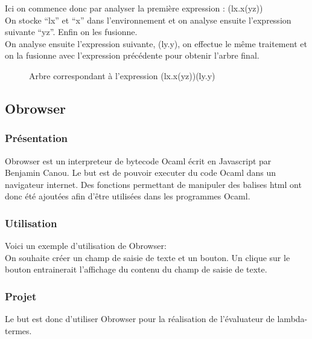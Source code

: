 \documentclass[a4paper,11pt,titlepage]{article}
\begin{document}
\newpage
Ici on commence donc par analyser la première expression : (lx.x(yz))\\
On stocke ``lx'' et ``x'' dans l'environnement et on analyse ensuite l'expression suivante ``yz''. Enfin on les fusionne.\\

On analyse ensuite l'expression suivante, (ly.y), on effectue le même traitement et on la fusionne avec l'expression précédente pour obtenir l'arbre final.
\begin{figure}[H]
\centering
  {
	 {{
		 {
			  {
			   {}
			   {
			      {{}
			       {}}
			   }
			  }
		 }
	 }
	{
		{}


	}}
  }
\caption{Arbre correspondant à l'expression (lx.x(yz))(ly.y)}
 \label{tree3}
\end{figure}

\subsection{Obrowser}

\subsubsection{Présentation}
Obrowser est un interpreteur de bytecode Ocaml écrit en Javascript par Benjamin Canou. Le but est de pouvoir executer du code Ocaml dans un navigateur internet. Des fonctions permettant de manipuler des balises html ont donc été ajoutées afin d'être 
utilisées dans les programmes Ocaml.

\subsubsection{Utilisation}
Voici un exemple d'utilisation de Obrowser:\\

On souhaite créer un champ de saisie de texte et un bouton. Un clique sur le bouton entrainerait l'affichage du contenu du champ de saisie de texte.

\subsubsection{Projet}
Le but est donc d'utiliser Obrowser pour la réalisation de l'évaluateur de lambda-termes. 
\end{document}
